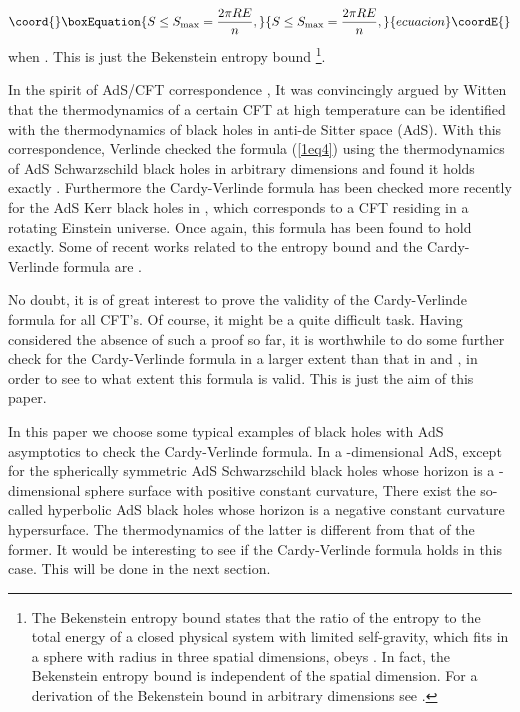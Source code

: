 \documentclass[a4paper,12pt]{article}
\begin{document}
\begin{equation}\coord{}\boxEquation{
S \le S_{\rm max}=\frac{2\pi R E}{n},
}{
S \le S_{\rm max}=\frac{2\pi R E}{n},
}{ecuacion}\coordE{}\end{equation}
when \coordHE{}. 
This is just the Bekenstein entropy bound \cite{Beke}\footnote{ The Bekenstein
entropy bound states that  the ratio of the entropy \coordHE{} to the total energy
\coordHE{} of a closed physical system with limited self-gravity, which fits in a 
sphere with radius \coordHE{} in three spatial dimensions, obeys \coordHE{}. 
In fact, the Bekenstein entropy bound is independent of  the spatial 
dimension. For a derivation of the Bekenstein bound in arbitrary dimensions 
see \cite{Bous}.}.   
  
In the spirit of  AdS/CFT correspondence \cite{Mald,Gubs,Witten1},
It was convincingly argued by Witten \cite{Witten2} that the thermodynamics
of a certain CFT at high temperature can be identified with the thermodynamics
of black holes in anti-de Sitter space (AdS). With this correspondence,
Verlinde checked the formula (\ref{1eq4}) using the thermodynamics of 
AdS Schwarzschild black holes in arbitrary dimensions and found it holds
exactly \cite{Verl}.  Furthermore the Cardy-Verlinde formula has been checked
more recently for the AdS Kerr black holes in \cite{Klem}, which corresponds
to a CFT residing in a rotating Einstein universe. Once again, this formula has 
been found to hold exactly. Some of recent works related to the entropy bound
and the Cardy-Verlinde formula are \cite{Kuta,Lin,Noji,Wang,Brus,Savo}. 


No doubt, it is of great interest to prove the validity of the Cardy-Verlinde
formula for all CFT's. Of course, it might be a quite difficult task.  Having 
considered the absence of such a proof so far, it is worthwhile to do some 
further check for the Cardy-Verlinde 
formula in a larger extent than that in \cite{Verl} and \cite{Klem}, in 
order to see to what extent this formula is valid. This is just the aim of 
this paper.  
  

In this paper  we choose some typical examples of black holes with AdS 
asymptotics to check the Cardy-Verlinde 
formula. In a \coordHE{}-dimensional AdS, except for the spherically symmetric 
AdS Schwarzschild black holes whose horizon is a \coordHE{}-dimensional sphere 
surface with positive constant curvature, There exist the so-called
hyperbolic AdS black holes whose horizon is a negative constant curvature
hypersurface. The thermodynamics of the latter is different from that of the
former. It would be interesting to see if the Cardy-Verlinde formula holds
in this case. This will be done in the next section. 
\end{document}
